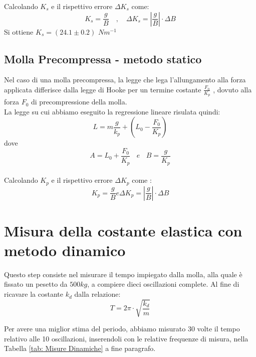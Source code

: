 \documentclass[12pt, a4paper]{article}
\begin{document}
Calcolando $K_s$ e il rispettivo errore $\Delta K_s$ come:
\begin{equation*}
    K_s= \frac{g}{B} \quad , \quad \Delta K_s = \left | \frac{g}{B}  \right | \cdot \Delta B 
\end{equation*}
Si ottiene $K_s = (24.1 \pm 0.2)$ $N m^{-1}$



\subsection{Molla Precompressa - metodo statico}
Nel caso di una molla precompressa, la legge che lega l'allungamento alla forza applicata differisce dalla legge di Hooke per un termine costante $\frac{F_0}{K_p}$ , dovuto alla forza $F_0$ di precompressione della molla.  
\\La legge su cui abbiamo eseguito la regressione lineare risulata quindi: 
\begin{equation}
    L = m \frac{g}{k_p} + (L_0 - \frac{F_0}{K_p}) 
\end{equation}
dove 
\begin{equation}
    A = L_0 + \frac{F_0}{K_p} \  \ \ \   e   \ \ \ \ B = \frac{g}{K_p}
\end{equation}
\\Calcolando $K_p$ e il rispettivo errore $\Delta K_p$ come : 
\begin{equation}
    K_p = \frac{g}{B} e \Delta K_p = \left | \frac{g}{B}  \right | \cdot \Delta B 
\end{equation}






\section{Misura della costante elastica con metodo dinamico }
Questo step consiste nel misurare il tempo impiegato dalla molla, alla quale è fissato un pesetto da $500kg$, a compiere dieci oscillazioni complete. Al fine di ricavare la costante $k_d$ dalla relazione: 
\begin{equation}
    T = 2\pi \cdot \sqrt{\frac{k_d}{m}}
\end{equation} 

Per avere una miglior stima del periodo, abbiamo misurato 30  volte il tempo relativo alle 10 oscillazioni, inserendoli con le relative frequenze di misura, nella Tabella \ref{tab: Misure Dinamiche} a fine paragrafo.  
\end{document}
